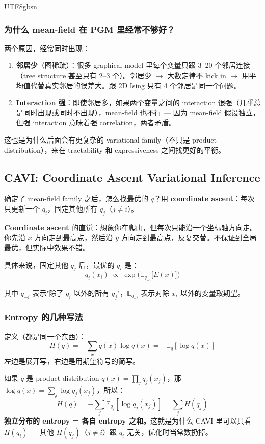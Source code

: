 \documentclass[11pt]{article}
\begin{document}
\begin{CJK}{UTF8}{gbsn}
\subsubsection{为什么 mean-field 在 PGM 里经常不够好？}

两个原因，经常同时出现：

\begin{enumerate}
  \item \textbf{邻居少}（图稀疏）：很多 graphical model 里每个变量只跟 3--20 个邻居连接（tree structure 甚至只有 2--3 个）。邻居少 $\to$ 大数定律不 kick in $\to$ 用平均值代替真实邻居的误差大。跟 2D Ising 只有 4 个邻居是同一个问题。
  \item \textbf{Interaction 强}：即使邻居多，如果两个变量之间的 interaction 很强（几乎总是同时出现或同时不出现），mean-field 也不行 --- 因为 mean-field 假设独立，但强 interaction 意味着强 correlation，两者矛盾。
\end{enumerate}

这也是为什么后面会有更复杂的 variational family（不只是 product distribution），来在 tractability 和 expressiveness 之间找更好的平衡。

\subsection{CAVI: Coordinate Ascent Variational Inference}

确定了 mean-field family 之后，怎么找最优的 $q$？用 \textbf{coordinate ascent}：每次只更新一个 $q_i$，固定其他所有 $q_j$（$j \neq i$）。

\textbf{Coordinate ascent} 的直觉：想象你在爬山，但每次只能沿一个坐标轴方向走。你先沿 $x$ 方向走到最高点，然后沿 $y$ 方向走到最高点，反复交替。不保证到全局最优，但实际中效果不错。

具体来说，固定其他 $q_j$ 后，最优的 $q_i$ 是：
\[
  q_i(x_i) \;\propto\; \exp\!\Big(\mathbb{E}_{q_{-i}}\big[E(x)\big]\Big)
\]

其中 $q_{-i}$ 表示"除了 $q_i$ 以外的所有 $q_j$"，$\mathbb{E}_{q_{-i}}$ 表示对除 $x_i$ 以外的变量取期望。

\subsubsection{Entropy 的几种写法}

定义（都是同一个东西）：
\[
  H(q) = -\sum_x q(x)\log q(x) = -\mathbb{E}_q[\log q(x)]
\]
左边是展开写，右边是用期望符号的简写。

如果 $q$ 是 product distribution $q(x) = \prod_j q_j(x_j)$，那 $\log q(x) = \sum_j \log q_j(x_j)$，所以：
\[
  H(q) = -\sum_j \mathbb{E}_{q_j}[\log q_j(x_j)] = \sum_j H(q_j)
\]
\textbf{独立分布的 entropy = 各自 entropy 之和。}这就是为什么 CAVI 里可以只看 $H(q_i)$ --- 其他 $H(q_j)$（$j \neq i$）跟 $q_i$ 无关，优化时当常数扔掉。


\end{CJK}
\end{document}
